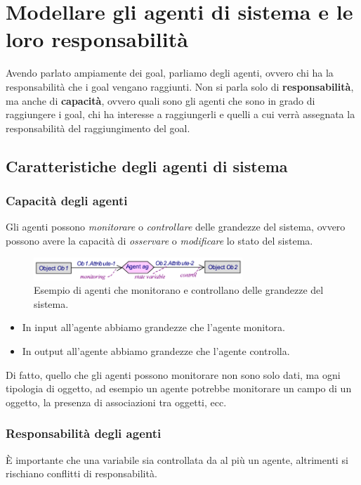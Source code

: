 \chapter{Modellare gli agenti di sistema e le loro responsabilità}
Avendo parlato ampiamente dei goal, parliamo degli agenti, ovvero chi ha la responsabilità 
che i goal vengano raggiunti. Non si parla solo di \textbf{responsabilità}, ma anche di 
\textbf{capacità}, ovvero quali sono gli agenti che sono in grado di raggiungere 
i goal, chi ha interesse a raggiungerli e quelli a cui verrà assegnata la responsabilità
del raggiungimento del goal.
\section{Caratteristiche degli agenti di sistema}
\subsection{Capacità degli agenti}
Gli agenti possono \textit{monitorare} o \textit{controllare} delle grandezze 
del sistema, ovvero possono avere la capacità di \textit{osservare} o \textit{modificare}
lo stato del sistema.

\begin{figure}[H]
    \centering
    \includegraphics[width=0.7\textwidth]{img/agents.png}
    \caption{Esempio di agenti che monitorano e
    controllano delle grandezze del sistema.}
    \label{fig:agenti}
\end{figure}
\begin{itemize}
    \item In input all'agente abbiamo grandezze 
    che l'agente monitora.
    \item In output all'agente abbiamo grandezze
    che l'agente controlla.
\end{itemize}
Di fatto, quello che gli agenti possono monitorare non sono solo 
dati, ma ogni tipologia di oggetto, ad esempio un agente potrebbe monitorare un 
campo di un oggetto, la presenza di associazioni tra oggetti, ecc.
\subsection{Responsabilità degli agenti}
È importante che una variabile sia controllata da al più un agente, altrimenti
si rischiano conflitti di responsabilità.

